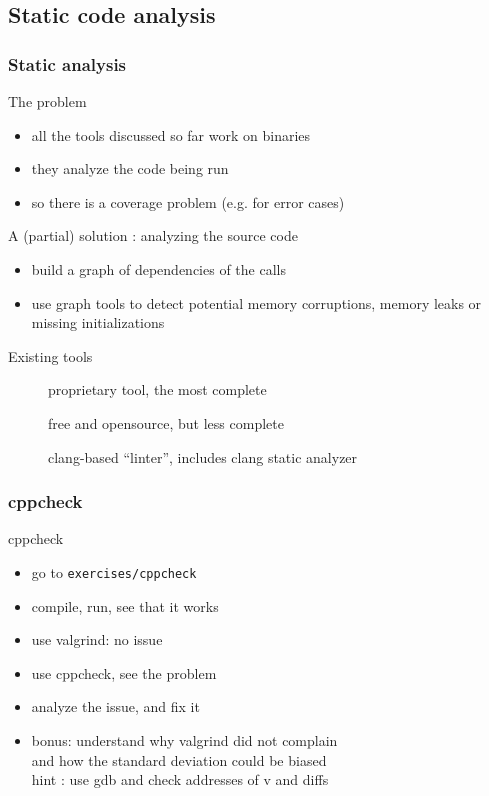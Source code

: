 \subsection[static]{Static code analysis}

\begin{frame}[fragile]
  \frametitle{Static analysis}
  \begin{alertblock}{The problem}
    \begin{itemize}
    \item all the tools discussed so far work on binaries
    \item they analyze the code being run
    \item so there is a coverage problem (e.g. for error cases)
    \end{itemize}
  \end{alertblock}
  \pause
  \begin{block}{A (partial) solution : analyzing the source code}
    \begin{itemize}
    \item build a graph of dependencies of the calls
    \item use graph tools to detect potential memory corruptions,
      memory leaks or missing initializations
    \end{itemize}
  \end{block}
  \pause
  \begin{block}{Existing tools}
    \begin{description}
    \item[\href{http://www.coverity.com/}{}]
      proprietary tool, the most complete
    \item[\href{http://cppcheck.sourceforge.net/}{}]
      free and opensource, but less complete
    \item[\href{https://clang.llvm.org/extra/clang-tidy/}{}]
      clang-based ``linter'', includes clang static analyzer
    \end{description}
  \end{block}
\end{frame}

\begin{frame}[fragile]
  \frametitle{cppcheck}
  \begin{exercise}{cppcheck}
    \begin{itemize}
    \item go to \texttt{exercises/cppcheck}
    \item compile, run, see that it works
    \item use valgrind: no issue
    \item use cppcheck, see the problem
    \item analyze the issue, and fix it
    \item bonus: understand why valgrind did not complain \\
      and how the standard deviation could be biased \\
      hint : use gdb and check addresses of v and diffs
    \end{itemize}
  \end{exercise}
\end{frame}

